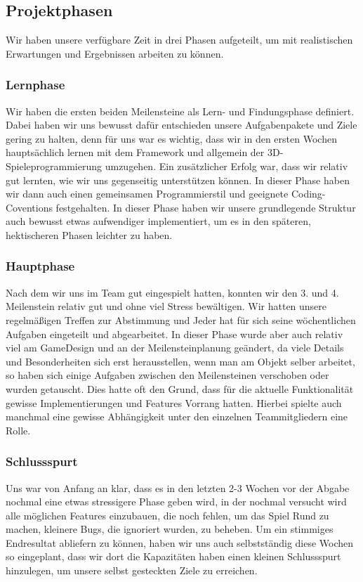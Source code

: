 \documentclass[10pt]{article}
\begin{document}
\subsection{Projektphasen}
Wir haben unsere verfügbare Zeit in drei Phasen aufgeteilt, um mit realistischen Erwartungen und Ergebnissen arbeiten zu können. \newline

\subsubsection{Lernphase}
Wir haben die ersten beiden Meilensteine als Lern- und Findungsphase definiert. Dabei haben wir uns bewusst dafür entschieden unsere Aufgabenpakete und Ziele gering zu halten, denn für uns war es wichtig, dass wir in den ersten Wochen hauptsächlich lernen mit dem Framework und allgemein der 3D-Spieleprogrammierung umzugehen. Ein zusätzlicher Erfolg war, dass wir relativ gut lernten, wie wir uns gegenseitig unterstützen können. In dieser Phase haben wir dann auch einen gemeinsamen Programmierstil und geeignete Coding-Coventions festgehalten. In dieser Phase haben wir unsere grundlegende Struktur auch bewusst etwas aufwendiger implementiert, um es in den späteren, hektischeren Phasen leichter zu haben.

\subsubsection{Hauptphase}
Nach dem wir uns im Team gut eingespielt hatten, konnten wir den 3. und 4. Meilenstein relativ gut und ohne viel Stress bewältigen. Wir hatten unsere regelmäßigen Treffen zur Abstimmung und Jeder hat für sich seine wöchentlichen Aufgaben eingeteilt und abgearbeitet. \newline
In dieser Phase wurde aber auch relativ viel am GameDesign und an der Meilensteinplanung geändert, da viele Details und Besonderheiten sich erst herausstellen, wenn man am Objekt selber arbeitet, so haben sich einige Aufgaben zwischen den Meilensteinen verschoben oder wurden getauscht. Dies hatte oft den Grund, dass für die aktuelle Funktionalität gewisse Implementierungen und Features Vorrang hatten. Hierbei spielte auch manchmal eine gewisse Abhängigkeit unter den einzelnen Teammitgliedern eine Rolle.

\subsubsection{Schlussspurt}
Uns war von Anfang an klar, dass es in den letzten 2-3 Wochen vor der Abgabe nochmal eine etwas stressigere Phase geben wird, in der nochmal versucht wird alle möglichen Features einzubauen, die noch fehlen, um das Spiel Rund zu machen, kleinere Bugs, die ignoriert wurden, zu beheben. Um ein stimmiges Endresultat abliefern zu können, haben wir uns auch selbstständig diese Wochen so eingeplant, dass wir dort die Kapazitäten haben einen kleinen Schlussspurt hinzulegen, um unsere selbst gesteckten Ziele zu erreichen.
\end{document}
